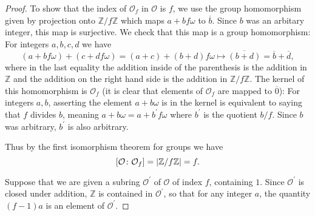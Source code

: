 \documentclass[11pt]{article}
\begin{document}
\begin{enumerate}
\begin{proof}
        To show that the index of $\mathcal{O}_f$ in $\mathcal{O}$ is $f$, we use the group homomorphism given by projection onto $\mathbb{Z}/f\mathbb{Z}$ which maps $a+bf\omega$ to $\overline{b}$. Since $b$ was an arbitary integer, this map is surjective. We check that this map is a group homomorphism: For integers $a,b,c,d$ we have \[(a+bf\omega) + (c+df\omega) = (a+c) + (b+d)f\omega \mapsto \overline{(b+d)} = \overline{b} + \overline{d},\] where in the last equality the addition inside of the parenthesis is the addition in $\mathbb{Z}$ and the addition on the right hand side is the addition in $\mathbb{Z}/f\mathbb{Z}$. The kernel of this homomorphism is $\mathcal{O}_f$ (it is clear that elements of $\mathcal{O}_f$ are mapped to $\overline{0}$): For integers $a,b$, asserting the element $a+b\omega$ is in the kernel is equivalent to saying that $f$ divides $b$, meaning $a+b\omega = a+b^{\prime}f\omega$ where $b^{\prime}$ is the quotient $b/f$. Since $b$ was arbitrary, $b^{\prime}$ is also arbitrary.

        Thus by the first isomorphism theorem for groups we have \[[\mathcal{O}\colon \mathcal{O}_f] = \abs{\mathbb{Z}/f\mathbb{Z}} = f.\]

        Suppose that we are given a subring $\mathcal{O}^{\prime}$ of $\mathcal{O}$ of index $f$, containing $1$. Since $\mathcal{O}^{\prime}$ is closed under addition, $\mathbb{Z}$ is contained in $\mathcal{O}^{\prime}$, so that for any integer $a$, the quantity $(f-1)a$ is an element of $\mathcal{O}^{\prime}$. 


\end{proof}
\end{enumerate}
\end{document}
